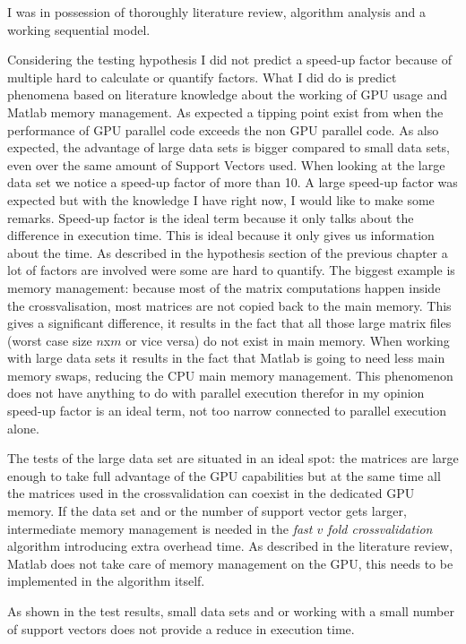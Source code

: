 I was in possession of thoroughly literature review, algorithm analysis and a working sequential model.
\par 
Considering the testing hypothesis I did not predict a speed-up factor because of multiple hard to calculate or quantify factors.
What I did do is predict phenomena based on literature knowledge about the working of GPU usage and Matlab memory management.
As expected a tipping point exist from when the performance of GPU parallel code exceeds the non GPU parallel code.
As also expected, the advantage of large data sets is bigger compared to small data sets, even over the same amount of Support Vectors used.
When looking at the large data set we notice a speed-up factor of more than 10.
A large speed-up factor was expected but with the knowledge I have right now, I would like to make some remarks.
Speed-up factor is the ideal term because it only talks about the difference in execution time.
This is ideal because it only gives us information about the time. 
As described in the hypothesis section of the previous chapter a lot of factors are involved were some are hard to quantify.
The biggest example is memory management: because most of the matrix computations happen inside the crossvalisation, most matrices are not copied back to the main memory.
This gives a significant difference, it results in the fact that all those large matrix files (worst case size $n$x$m$ or vice versa) do not exist in main memory.
When working with large data sets it results in the fact that Matlab is going to need less main memory swaps, reducing the CPU main memory management.
This phenomenon does not have anything to do with parallel execution therefor in my opinion speed-up factor is an ideal term, not too narrow connected to parallel execution alone.
\par 
The tests of the large data set are situated in an ideal spot: the matrices are large enough to take full advantage of the GPU capabilities but at the same time all the matrices used in the crossvalidation can coexist in the dedicated GPU memory.
If the data set and or the number of support vector gets larger, intermediate memory management is needed in the \textit{fast $v$ fold crossvalidation} algorithm introducing extra overhead time.
As described in the literature review, Matlab does not take care of memory management on the GPU, this needs to be implemented in the algorithm itself.
\par 
As shown in the test results, small data sets and or working with a small number of support vectors does not provide a reduce in execution time.

